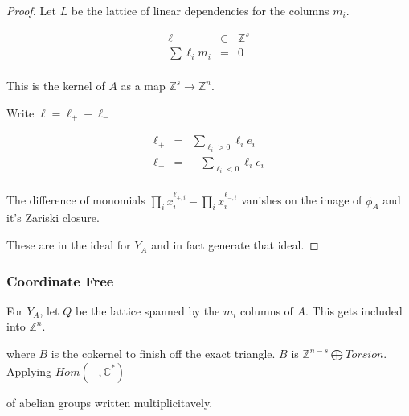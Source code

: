 \documentclass[11pt]{book}
\theoremstyle{change}
\theoremstyle{nonumberplain}
\newtheorem{proof}{Proof}
\numberwithin{equation}{section}
\begin{document}
\begin{proof}
Let $L$ be the lattice of linear dependencies for the columns $m_i$.

\begin{eqnarray*}
\ell &\in& \mathbb{Z}^s\\
\sum \ell_i m_i &=& 0\\
\end{eqnarray*}

This is the kernel of $A$ as a map $\mathbb{Z}^s \to \mathbb{Z}^n$.

Write $\ell = \ell_+ - \ell_-$

\begin{eqnarray*}
\ell_+ &=& \sum_{\ell_i > 0} \ell_i e_i\\
\ell_- &=& - \sum_{\ell_i < 0} \ell_i e_i\\
\end{eqnarray*}

The difference of monomials $\prod_i x_i^{\ell_{+,i}} - \prod_i x_i^{\ell_{-,i}}$ vanishes on the image of $\phi_A$ and it's Zariski closure.

These are in the ideal for $Y_A$ and in fact generate that ideal.

\end{proof}

\subsubsection{Coordinate Free}

For $Y_A$, let $Q$ be the lattice spanned by the $m_i$ columns of $A$. This gets included into $\mathbb{Z}^n$.

\begin{center}
\end{center}

where $B$ is the cokernel to finish off the exact triangle. $B$ is $\mathbb{Z}^{n-s} \bigoplus Torsion$. Applying $Hom (-,\mathbb{C}^*)$

\begin{center}
\end{center}

of abelian groups written multiplicitavely.
\end{document}

